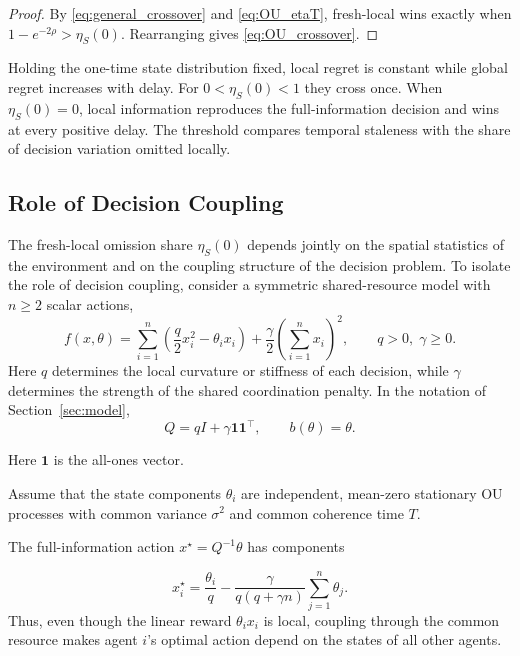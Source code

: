 \documentclass[11pt]{article}
\begin{document}
\begin{proof}
By \eqref{eq:general_crossover} and \eqref{eq:OU_etaT}, fresh-local wins
exactly when $1-e^{-2\rho}>\eta_S(0)$. Rearranging gives
\eqref{eq:OU_crossover}.
\end{proof}

Holding the one-time state distribution fixed, local regret is constant while
global regret increases with delay. For $0<\eta_S(0)<1$ they cross once.
When $\eta_S(0)=0$, local information reproduces the full-information decision
and wins at every positive delay. The threshold compares temporal staleness
with the share of decision variation omitted locally.

\subsection{Role of Decision Coupling}
\label{subsec:coupling_example}

The fresh-local omission share $\eta_S(0)$ depends jointly on the
spatial statistics of the environment and on the coupling structure of the
decision problem. To isolate the role of decision coupling, consider a
symmetric shared-resource model with $n\ge2$ scalar actions,
\begin{equation}
    f(x,\theta)
    =
    \sum_{i=1}^{n}
    \left(
        \frac{q}{2}x_i^2-\theta_i x_i
    \right)
    +
    \frac{\gamma}{2}
    \left(
        \sum_{i=1}^{n}x_i
    \right)^2,
    \qquad
    q>0,\;\gamma\ge0.
    \label{eq:shared_resource_cost}
\end{equation}
Here $q$ determines the local curvature or stiffness of each decision, while
$\gamma$ determines the strength of the shared coordination penalty. In the
notation of Section~\ref{sec:model},
\begin{equation}
    Q
    =
    qI+\gamma\mathbf{1}\mathbf{1}^\top,
    \qquad
    b(\theta)=\theta.
    \label{eq:shared_resource_Q}
\end{equation}

Here $\mathbf1$ is the all-ones vector.

Assume that the state components $\theta_i$ are independent, mean-zero
stationary OU processes with common variance $\sigma^2$ and common coherence
time $T$.

The full-information action $x^\star=Q^{-1}\theta$ has components

\begin{equation}
    x_i^\star
    =
    \frac{\theta_i}{q}
    -
    \frac{\gamma}
    {q(q+\gamma n)}
    \sum_{j=1}^{n}\theta_j.
    \label{eq:shared_resource_xstar}
\end{equation}
Thus, even though the linear reward $\theta_i x_i$ is local, coupling through
the common resource makes agent $i$'s optimal action depend on the states of
all other agents.
\end{document}
